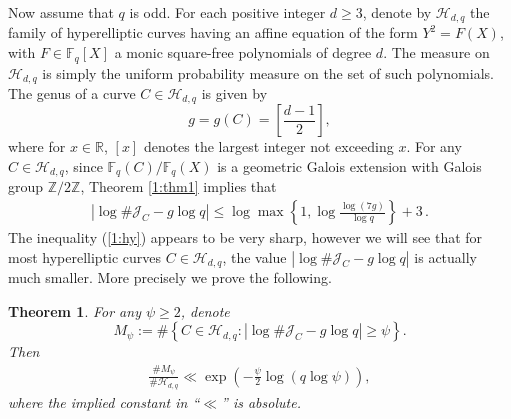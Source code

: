 \documentclass[12pt]{amsart}
\theoremstyle{plain}
\newtheorem{thm}{Theorem}
\newcommand{\Z}{{\mathbb Z}}
\newcommand{\R}{{\mathbb R}}
\newcommand{\F}{{\mathbb F}_q}
\newcommand{\J}{\mathcal J}
\newcommand{\HH}{{\mathcal H}}
\begin{document}
Now assume that $q$ is odd. For each positive integer $d \ge 3$, denote by $\HH_{d,q}$ the family of hyperelliptic curves having an affine equation of the form $Y^2=F(X)$, with $F \in \F[X]$ a monic square-free polynomials of degree $d$. The measure on $\HH_{d,q}$ is simply the uniform probability measure on the set of such polynomials. The genus of a curve $C \in \HH_{d,q}$ is given by
\[g=g(C)=\left[\frac{d-1}{2}\right],\]
where for $x \in \R$, $[x]$ denotes the largest integer not exceeding $x$. For any $C \in \HH_{d,q}$, since $\F(C)/\F(X)$ is a geometric Galois extension with Galois group $\Z/2\Z$, Theorem \ref{1:thm1} implies that
\begin{eqnarray} \label{1:hy} \left|\log \# \J_{C}-g \log q\right| \le \log \max \left\{1,\log \frac{\log (7g)}{\log q}\right\}+3\,.\end{eqnarray}
The inequality (\ref{1:hy}) appears to be very sharp, however we will see that for most hyperelliptic curves $C \in \HH_{d,q}$, the value $|\log \# \J_{C}-g \log q|$ is actually much smaller. More precisely we prove the following. %

\begin{thm} \label{1:thm2}
For any $\psi \ge 2$, denote
\[M_{\psi}:=\#\left\{C \in \HH_{d,q}: |\log \#\J_{C}-g \log q| \ge \psi\right\}. \]
Then
\begin{eqnarray*} \frac{\#M_{\psi}}{\# \HH_{d,q}} \ll \exp\left(-\frac{\psi}{2} \log(q\log \psi)\right),\end{eqnarray*}
where the implied constant in ``$\ll$'' is absolute.
\end{thm}
\end{document}
